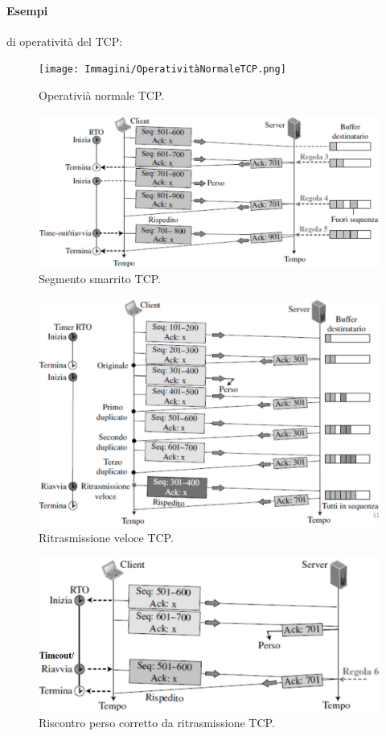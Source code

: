 \paragraph{Esempi} di operatività del TCP:
\begin{figure}[h]
    \centering
    \texttt{[image: Immagini/OperativitàNormaleTCP.png]}
    \caption{Operativià normale TCP.}
\end{figure}
\begin{figure}
    \centering
    \includegraphics[scale=0.26]{Immagini/TCPSegmentoSmarrito.png}
    \caption{Segmento smarrito TCP.}
\end{figure}
\begin{figure}
    \centering
    \includegraphics[scale=0.29]{Immagini/TCPRitrasmissioneVeloce.png}
    \caption{Ritrasmissione veloce TCP.}
\end{figure}
\begin{figure}
    \centering
    \includegraphics[scale=0.27]{Immagini/TCPRiscontroPersoCorrettoDaRitrasmissione.png}
    \caption{Riscontro perso corretto da ritrasmissione TCP.}
\end{figure}
